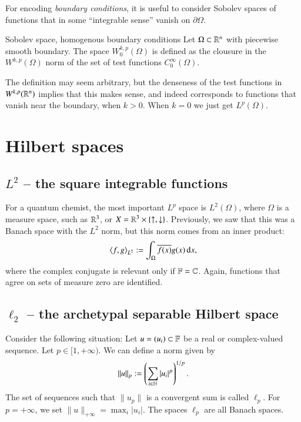 For encoding \emph{boundary conditions}, it is useful to consider Sobolev spaces of functions that in some ``integrable sense'' vanish on $\partial \Omega$.
\begin{myDefinition}{Sobolev space, homogenous boundary conditions}{}
Let $\Omega\subset \mathbb{R}^n$ with piecewise smooth boundary. The space $W^{k,p}_0(\Omega)$ is defined as the clousure in the $W^{k,p}(\Omega)$ norm of the set of test functions $C^\infty_0(\Omega)$.
\end{myDefinition}
The definition may seem arbitrary, but the denseness of the test functions in $W^{k,p}(\mathbb{R}^n)$ implies that this makes sense, and indeed corresponds to functions that vanish near the boundary, when $k>0$. When $k=0$ we just get $L^p(\Omega)$.

\section{Hilbert spaces}

\subsection{$L^2$ -- the square integrable functions}

For a quantum chemist, the most important $L^p$ space is $L^2(\Omega)$, where $\Omega$ is a measure space, such as $\mathbb{R}^3$, or $X = \mathbb{R}^3 \times \{\uparrow,\downarrow\}$. Previously, we saw that this was a Banach space with the $L^2$ norm, but this norm comes from an inner product:
\begin{equation}
    \braket{f,g}_{L^2} := \int_\Omega \overline{f(x)} g(x) \, \mathrm{d} x,
\end{equation}
where the complex conjugate is relevant only if $\mathbb{F} = \mathbb{C}$. Again, functions that agree on sets of measure zero are identified.

\subsection{$\ell_2$ -- the archetypal separable Hilbert space}

Consider the following situation: Let $u = (u_i) \subset \mathbb{F}$ be a real or complex-valued sequence. Let $p \in [1,+\infty)$. We can define a norm given by
\begin{equation}
    \|u\|_p := \left(\sum_{i\in\mathbb{N}} |u_i|^p \right)^{1/p}.
\end{equation}
The set of sequences such that $\|u_p\|$ is a convergent sum is called $\ell_p$. For $p=+\infty$, we set $\|u\|_{+\infty} = \max_i |u_i|$. The spaces $\ell_p$ are all Banach spaces.

